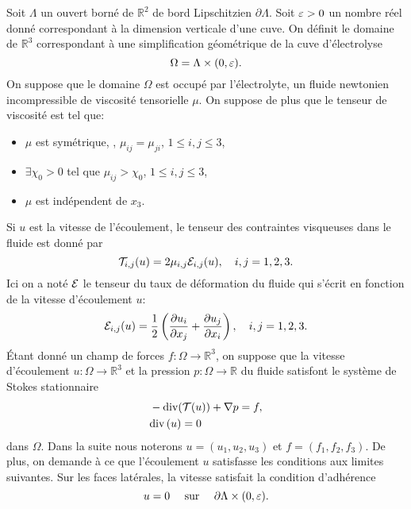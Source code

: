 Soit $\Lambda$ un ouvert borné de $\mathbb R^2$ de bord Lipschitzien
$\partial\Lambda$. Soit $\varepsilon > 0$ un nombre réel donné
correspondant à la dimension verticale d'une cuve. On définit le
domaine de $\mathbb R^3$ correspondant à une simplification
géométrique de la cuve d'électrolyse
\begin{equation}\label{eq:domain}
  \Omega = \Lambda \times (0,\varepsilon).
\end{equation}
On suppose que le domaine $\Omega$ est occupé par l'électrolyte, un
fluide newtonien incompressible de viscosité tensorielle $\mu$. On suppose de plus
que le tenseur de viscosité est tel que:
\begin{itemize}
  \item $\mu$ est symétrique, \ie, $\mu_{ij} = \mu_{ji}$, $1\leq
    i,j\leq 3$,
  \item $\exists \chi_0 > 0$ tel que $\mu_{ij} > \chi_0$, $1\leq
    i,j\leq 3$,
    \item $\mu$ est indépendent de $x_3$.
\end{itemize}
Si $u$ est la
vitesse de l'écoulement, le tenseur des contraintes visqueuses dans le
fluide \cite{Landau1987} est donné par
\begin{equation}
  \mathcal T_{i,j}(u) = 2\mu_{i,j}
  \mathcal E_{i,j}(u),\quad i,j = 1,2,3.
\end{equation}
Ici on a noté $\mathcal E$ le tenseur du taux de déformation du
fluide qui s'écrit en fonction de la vitesse d'écoulement $u$:
\begin{equation}
  \mathcal E_{i,j}(u) = \frac{1}{2}\left( \frac{\partial u_i}{\partial x_j} + \frac{\partial u_j}{\partial x_i} \right),\quad i,j = 1,2,3.
\end{equation}
Étant donné un champ de forces $f:\Omega\to \mathbb R^3$, on suppose
que la vitesse d'écoulement $u:\Omega \to \mathbb R^3$ et la pression
$p:\Omega \to \mathbb R$ du fluide satisfont le système de Stokes stationnaire
\begin{align}
  &- \mathrm{div}(\mathcal T(u)) + \nabla p = f,\label{eq:stokes-u}\\
  &\mathrm{div} \left( u \right) = 0\label{eq:stokes-p}
\end{align}
dans $\Omega$. Dans la suite nous noterons $u = (u_1, u_2, u_3)$ et $f =
(f_1, f_2, f_3)$. De plus, on demande à ce que l'écoulement $u$ satisfasse
les conditions aux limites suivantes. Sur les faces latérales, la
vitesse satisfait la condition d'adhérence
\begin{equation}
  u = 0\quad \text{ sur } \quad\partial \Lambda\times(0,\varepsilon).\label{eq:stokes-bc-1}
\end{equation}
